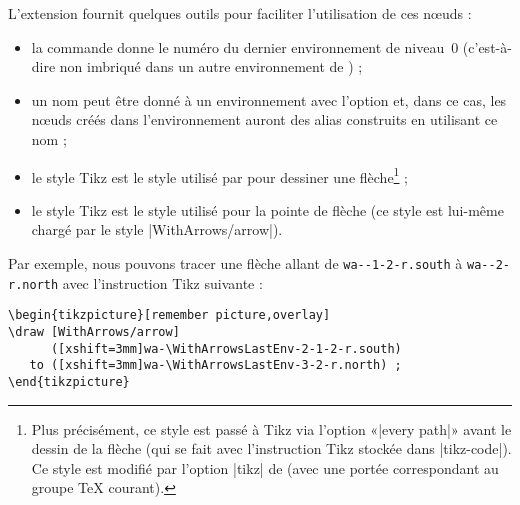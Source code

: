 \documentclass[dvipsnames]{article}%
\begin{document}
\medskip
L'extension  fournit quelques outils pour faciliter l'utilisation de ces nœuds :
\begin{itemize}
\item la commande  donne le numéro du dernier
environnement de niveau~$0$ (c'est-à-dire non imbriqué dans un autre environnement de
) ; 

\item un nom peut être donné à un environnement avec l'option  et, dans
ce cas, les nœuds créés dans l'environnement auront des alias construits en utilisant ce
nom ;

\item le style Tikz  est le style utilisé par
 pour dessiner une flèche\footnote{Plus précisément, ce style est passé à Tikz via l'option «|every path|» avant le dessin de la
  flèche (qui se fait avec l'instruction Tikz stockée dans |tikz-code|). Ce style est modifié par l'option
  |tikz| de  (avec une portée correspondant au groupe TeX courant).} ;

\item le style Tikz  est le style utilisé pour la pointe
de flèche (ce style est lui-même chargé par le style |WithArrows/arrow|).
\end{itemize}

Par exemple, nous pouvons tracer une flèche allant de  \texttt{wa--1-2-r.south}
à \texttt{wa--2-r.north} avec l'instruction Tikz suivante :

\begin{Verbatim}
\begin{tikzpicture}[remember picture,overlay]
\draw [WithArrows/arrow] 
      ([xshift=3mm]wa-\WithArrowsLastEnv-2-1-2-r.south)
   to ([xshift=3mm]wa-\WithArrowsLastEnv-3-2-r.north) ;
\end{tikzpicture}
\end{Verbatim}
\end{document}
